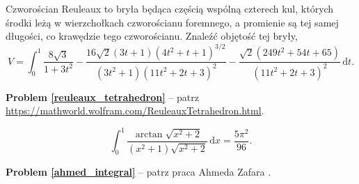 %

\begin{problem_with_solution}
    \label{reuleaux_tetrahedron}%
    Czworościan Reuleaux to bryła będąca częścią wspólną czterech kul, których środki leżą w wierzchołkach czworościanu foremnego, a promienie są tej samej długości, co krawędzie tego czworościanu.
    Znaleźć objętość tej bryły,
    \begin{equation}
        V = \int_0^1
        \frac{
            8\sqrt{3}
        }{
            1 + 3t^2
        } - \frac{
            16 \sqrt{2} (3t+1) (4t^2 +t+1)^{3/2}
        }{
            (3t^2+1)(11t^2 + 2t + 3)^2
        } - \frac{
            \sqrt{2} (249 t^2 + 54t + 65)
        }{
            (11t^2 + 2t +3)^2
        } \,\mathrm{d} t.
    \end{equation}
\end{problem_with_solution}

\textbf{Problem \ref{reuleaux_tetrahedron}} -- patrz \url{https://mathworld.wolfram.com/ReuleauxTetrahedron.html}.

\begin{problem_with_solution}
    \label{ahmed_integral}%
    \begin{equation}
        \int_0^1 \frac{\arctan \sqrt{x^2+2}}{(x^2+1) \sqrt{x^2+2}} \,\mathrm{d}x = \frac{5\pi^2}{96}.
    \end{equation}
\end{problem_with_solution}

\textbf{Problem \ref{ahmed_integral}} -- patrz praca Ahmeda Zafara \cite{ahmed02}.


%